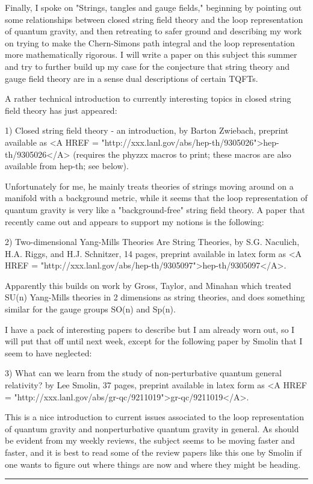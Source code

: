 Finally, I spoke on "Strings, tangles and gauge fields," beginning by
pointing out some relationships between closed string field theory and
the loop representation of quantum gravity, and then retreating to safer
ground and describing my work on trying to make the Chern-Simons path
integral and the loop representation more mathematically rigorous.   I
will write a paper on this subject this summer and try to further build
up my case for the conjecture that string theory and gauge field theory
are in a sense dual descriptions of certain TQFTs.

A rather technical introduction to currently interesting topics in
closed string field theory has just appeared:

1) Closed string field theory - an introduction, by Barton Zwiebach,
preprint available as <A HREF = "http://xxx.lanl.gov/abs/hep-th/9305026">hep-th/9305026</A> (requires the phyzzx macros to print; 
these macros are also available from hep-th; see below).

Unfortunately for me, he mainly treats theories of strings moving around
on a manifold with a background metric, while it seems that the loop
representation of quantum gravity is very like a "background-free"
string field theory.  A paper that recently came out and appears to support 
my notions is the following:

2) Two-dimensional Yang-Mills Theories Are String Theories, by S.G.
Naculich, H.A. Riggs, and H.J. Schnitzer, 14 pages, preprint available
in latex form as <A HREF = "http://xxx.lanl.gov/abs/hep-th/9305097">hep-th/9305097</A>.

Apparently this builds on work by Gross, Taylor, and Minahan which
treated SU(n) Yang-Mills theories in 2 dimensions as string theories,
and does something similar for the gauge groups SO(n) and Sp(n).  




I have a pack of interesting papers to describe but I am already worn
out, so I will put that off until next week, except for the following
paper by Smolin that I seem to have neglected:

3) What can we learn from the study of non-perturbative quantum general
relativity? by Lee Smolin, 37 pages, preprint available in latex form as
<A HREF = "http://xxx.lanl.gov/abs/gr-qc/9211019">gr-qc/9211019</A>.

This is a nice introduction to current issues associated to the loop
representation of quantum gravity and nonperturbative quantum gravity in
general.  As should be evident from my weekly reviews, the subject seems
to be moving faster and faster, and it is best to read some of the
review papers like this one by Smolin if one wants to figure out where
things are now and where they might be heading.
\par\noindent\rule{\textwidth}{0.4pt}

